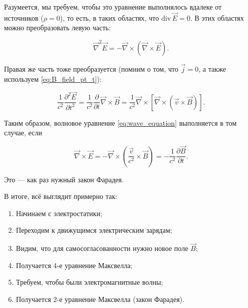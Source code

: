 \documentclass[12pt]{article}
\newcommand{\pt}{\partial}
\renewcommand{\div}{\mathrm{div}\,}
\newcommand{\vn}{\vec{\nabla}}
\begin{document}
Разумеется, мы требуем, чтобы это уравнение выполнялось вдалеке от
источников ($\rho=0$), то есть, в таких областях, что $\div \vec{E} = 0$. В этих
областях можно преобразовать левую часть: 

\begin{equation}
  \vn^2 \vec{E} = - \vn \times (\vn \times \vec{E}).
\end{equation}

Правая же часть тоже преобразуется (помним о том, что $\vec{j}=0$, а
также используем \eqref{eq:B_field_pt_t}):

\begin{equation}
  \frac{1}{c^2}  \frac{\pt^2\vec{E}}{\pt t^2} = \frac{1}{c^2}
  \frac{\pt}{\pt t} \vn \times \vec{B} = \frac{1}{c^2} \vn \times \left[
    \vn \times \left( \vec{v} \times \vec{B} \right) \right].
\end{equation}

Таким образом, волновое уравнение \eqref{eq:wave_equation} выполняется
в том случае, если

\begin{equation}
  \vn \times \vec{E} = -\vn \times \left( \frac{\vec{v}}{c^2} \times
    \vec{B} \right) = -\frac{1}{c^2} \frac{\pt \vec{B}}{\pt t}. 
\end{equation}

Это — как раз нужный закон Фарадея. 

В итоге, всё выглядит примерно так: 
\begin{enumerate}
\item Начинаем с электростатики;
\item Переходим к движущимся электрическим зарядам;
\item Видим, что для самосогласованности нужно новое поле $\vec{B}$;
\item Получается 4-е уравнение Максвелла;
\item Требуем, чтобы были электромагнитные волны;
\item Получается 2-е уравнение Максвелла (закон Фарадея).
\end{enumerate}
\end{document}
